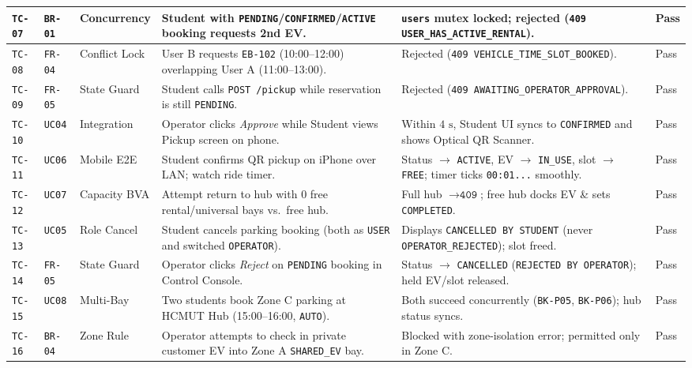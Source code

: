 \begin{table}[H]
\begin{tabularx}{\textwidth}{|C{1.25cm}|C{1.40cm}|L{1.95cm}|Y|L{3.95cm}|C{0.95cm}|}
    \hline
    \texttt{TC-07} & \texttt{BR-01} & Concurrency & Student with \texttt{PENDING}/\allowbreak\texttt{CONFIRMED}/\allowbreak\texttt{ACTIVE} booking requests 2nd EV. & \texttt{users} mutex locked; rejected (\texttt{409 USER\_\allowbreak HAS\_\allowbreak ACTIVE\_\allowbreak RENTAL}). & Pass \\
    \hline
    \texttt{TC-08} & \texttt{FR-04} & Conflict Lock & User B requests \texttt{EB-102} (10:00--12:00) overlapping User A (11:00--13:00). & Rejected (\texttt{409 VEHICLE\_\allowbreak TIME\_\allowbreak SLOT\_\allowbreak BOOKED}). & Pass \\
    \hline
    \texttt{TC-09} & \texttt{FR-05} & State Guard & Student calls \texttt{POST /pickup} while reservation is still \texttt{PENDING}. & Rejected (\texttt{409 AWAITING\_\allowbreak OPERATOR\_\allowbreak APPROVAL}). & Pass \\
    \hline
    \texttt{TC-10} & \texttt{UC04} & Integration & Operator clicks \textit{Approve} while Student views Pickup screen on phone. & Within $4\text{ s}$, Student UI syncs to \texttt{CONFIRMED} and shows Optical QR Scanner. & Pass \\
    \hline
    \texttt{TC-11} & \texttt{UC06} & Mobile E2E & Student confirms QR pickup on iPhone over LAN; watch ride timer. & Status $\rightarrow$ \texttt{ACTIVE}, EV $\rightarrow$ \texttt{IN\_\allowbreak USE}, slot $\rightarrow$ \texttt{FREE}; timer ticks \texttt{00:01...} smoothly. & Pass \\
    \hline
    \texttt{TC-12} & \texttt{UC07} & Capacity BVA & Attempt return to hub with $0$ free rental/universal bays vs.\ free hub. & Full hub $\rightarrow \texttt{409}$; free hub docks EV \& sets \texttt{COMPLETED}. & Pass \\
    \hline
    \texttt{TC-13} & \texttt{UC05} & Role Cancel & Student cancels parking booking (both as \texttt{USER} and switched \texttt{OPERATOR}). & Displays \texttt{CANCELLED BY STUDENT} (never \texttt{OPERATOR\_\allowbreak REJECTED}); slot freed. & Pass \\
    \hline
    \texttt{TC-14} & \texttt{FR-05} & State Guard & Operator clicks \textit{Reject} on \texttt{PENDING} booking in Control Console. & Status $\rightarrow$ \texttt{CANCELLED} (\texttt{REJECTED BY OPERATOR}); held EV/slot released. & Pass \\
    \hline
    \texttt{TC-15} & \texttt{UC08} & Multi-Bay & Two students book Zone C parking at HCMUT Hub (15:00--16:00, \texttt{AUTO}). & Both succeed concurrently (\texttt{BK-P05}, \texttt{BK-P06}); hub status syncs. & Pass \\
    \hline
    \texttt{TC-16} & \texttt{BR-04} & Zone Rule & Operator attempts to check in private customer EV into Zone A \texttt{SHARED\_\allowbreak EV} bay. & Blocked with zone-isolation error; permitted only in Zone C. & Pass \\
    \hline
  \end{tabularx}
\end{table}

